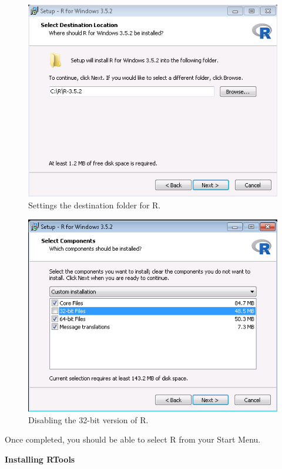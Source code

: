 \documentclass[11pt]{book}
\begin{document}
\begin{figure}

{\centering \includegraphics[width=0.8\linewidth]{images/OhdsiAnalyticsTools/rDestination} 

}

\caption{Settings the destination folder for R.}\label{fig:rDestination}
\end{figure}

\begin{figure}

{\centering \includegraphics[width=0.8\linewidth]{images/OhdsiAnalyticsTools/no32Bits} 

}

\caption{Disabling the 32-bit version of R.}\label{fig:no32Bits}
\end{figure}

Once completed, you should be able to select R from your Start Menu.

\textbf{Installing RTools}
\end{document}
